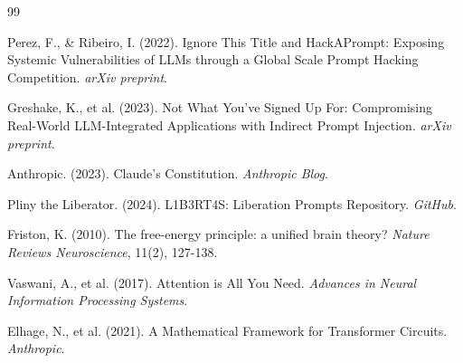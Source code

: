 \documentclass[11pt,a4paper]{article}
\theoremstyle{plain}
\theoremstyle{definition}
\theoremstyle{remark}
\begin{document}
\begin{thebibliography}{99}

 Perez, F., \& Ribeiro, I. (2022). Ignore This Title and HackAPrompt: Exposing Systemic Vulnerabilities of LLMs through a Global Scale Prompt Hacking Competition. \emph{arXiv preprint}.

 Greshake, K., et al. (2023). Not What You've Signed Up For: Compromising Real-World LLM-Integrated Applications with Indirect Prompt Injection. \emph{arXiv preprint}.

 Anthropic. (2023). Claude's Constitution. \emph{Anthropic Blog}.

 Pliny the Liberator. (2024). L1B3RT4S: Liberation Prompts Repository. \emph{GitHub}.

 Friston, K. (2010). The free-energy principle: a unified brain theory? \emph{Nature Reviews Neuroscience}, 11(2), 127-138.

 Vaswani, A., et al. (2017). Attention is All You Need. \emph{Advances in Neural Information Processing Systems}.

 Elhage, N., et al. (2021). A Mathematical Framework for Transformer Circuits. \emph{Anthropic}.

\end{thebibliography}
\end{document}
